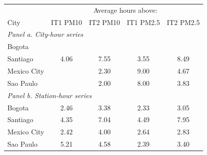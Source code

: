 \begin{tabular}{lcccc}
    \toprule
    \toprule
     & \multicolumn{4}{c}{Average hours above:} \\
    City & IT1 PM10 & IT2 PM10 & IT1 PM2.5 & IT2 PM2.5 \\
    \midrule
    \multicolumn{5}{l}{\textit{Panel a. City-hour series}} \\
    \midrule
    Bogota &  &  &  &  \\
    Santiago & 4.06 & 7.55 & 3.55 & 8.49 \\
    Mexico City &  & 2.30 & 9.00 & 4.67 \\
    Sao Paulo &  & 2.00 & 8.00 & 3.83 \\
    \midrule
    \multicolumn{5}{l}{\textit{Panel b. Station-hour series}} \\
    \midrule
    Bogota & 2.46 & 3.38 & 2.33 & 3.05 \\
    Santiago & 4.35 & 7.04 & 4.49 & 7.95 \\
    Mexico City & 2.42 & 4.00 & 2.64 & 2.83 \\
    Sao Paulo & 5.21 & 4.58 & 2.39 & 3.40 \\
    \bottomrule
    \bottomrule
\end{tabular}
